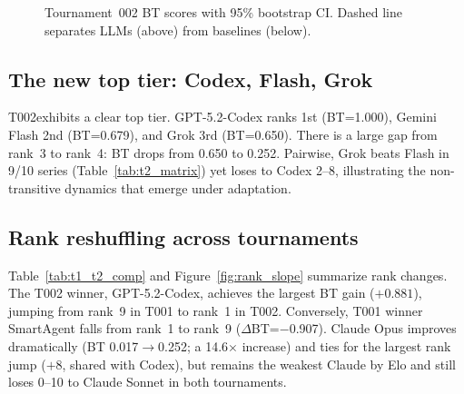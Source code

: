 \documentclass[11pt]{article}
\newcommand{\tOne}{T001}
\newcommand{\tTwo}{T002}
\begin{document}
\begin{figure}[t]
\centering
{}
\caption{Tournament~002 BT scores with 95\% bootstrap CI. Dashed line separates LLMs (above) from baselines (below).}
\label{fig:t2_bt}
\end{figure}

\subsection{The new top tier: Codex, Flash, Grok}

\tTwo exhibits a clear top tier.
GPT-5.2-Codex ranks 1st (BT=1.000), Gemini Flash 2nd (BT=0.679), and Grok 3rd (BT=0.650).
There is a large gap from rank~3 to rank~4: BT drops from 0.650 to 0.252.
Pairwise, Grok beats Flash in 9/10 series (Table~\ref{tab:t2_matrix}) yet loses to Codex 2--8, illustrating the non-transitive dynamics that emerge under adaptation.

\subsection{Rank reshuffling across tournaments}

Table~\ref{tab:t1_t2_comp} and Figure~\ref{fig:rank_slope} summarize rank changes.
The \tTwo{} winner, GPT-5.2-Codex, achieves the largest BT gain ($+0.881$), jumping from rank~9 in \tOne{} to rank~1 in \tTwo.
Conversely, \tOne{} winner SmartAgent falls from rank~1 to rank~9 ($\Delta$BT=$-$0.907).
Claude Opus improves dramatically (BT 0.017$\to$0.252; a 14.6$\times$ increase) and ties for the largest rank jump ($+$8, shared with Codex), but remains the weakest Claude by Elo and still loses 0--10 to Claude Sonnet in both tournaments.
\end{document}

